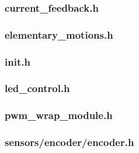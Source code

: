 %
%

\newpage
\subsubsection{current\_feedback.h}
\label{module_current_feedback}



\newpage
\subsubsection{elementary\_motions.h}
\label{module_elementary_motions}



\newpage
\subsubsection{init.h}
\label{module_init}



\newpage
\subsubsection{led\_control.h}
\label{module_led_control}



\newpage
\subsubsection{pwm\_wrap\_module.h}
\label{module_pwm_wrap_module}



\newpage
\subsubsection{sensors/encoder/encoder.h}
\label{module_sensors_encoder}



